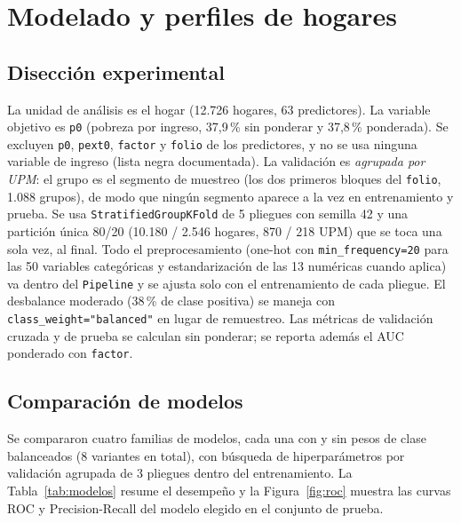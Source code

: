 \section{Modelado y perfiles de hogares}
\subsection{Disección experimental}
La unidad de análisis es el hogar (12.726 hogares, 63 predictores). La variable objetivo es \texttt{p0} (pobreza por ingreso, 37,9\,\% sin ponderar y 37,8\,\% ponderada). Se excluyen \texttt{p0}, \texttt{pext0}, \texttt{factor} y \texttt{folio} de los predictores, y no se usa ninguna variable de ingreso (lista negra documentada). La validación es \emph{agrupada por UPM}: el grupo es el segmento de muestreo (los dos primeros bloques del \texttt{folio}, 1.088 grupos), de modo que ningún segmento aparece a la vez en entrenamiento y prueba. Se usa \texttt{StratifiedGroupKFold} de 5 pliegues con semilla 42 y una partición única 80/20 (10.180 / 2.546 hogares, 870 / 218 UPM) que se toca una sola vez, al final. Todo el preprocesamiento (one-hot con \texttt{min\_frequency=20} para las 50 variables categóricas y estandarización de las 13 numéricas cuando aplica) va dentro del \texttt{Pipeline} y se ajusta solo con el entrenamiento de cada pliegue. El desbalance moderado (38\,\% de clase positiva) se maneja con \texttt{class\_weight="balanced"} en lugar de remuestreo. Las métricas de validación cruzada y de prueba se calculan sin ponderar; se reporta además el AUC ponderado con \texttt{factor}.

\subsection{Comparación de modelos}\label{sec:comparacion}
Se compararon cuatro familias de modelos, cada una con y sin pesos de clase balanceados (8 variantes en total), con búsqueda de hiperparámetros por validación agrupada de 3 pliegues dentro del entrenamiento. La Tabla~\ref{tab:modelos} resume el desempeño y la Figura~\ref{fig:roc} muestra las curvas ROC y Precision-Recall del modelo elegido en el conjunto de prueba.

